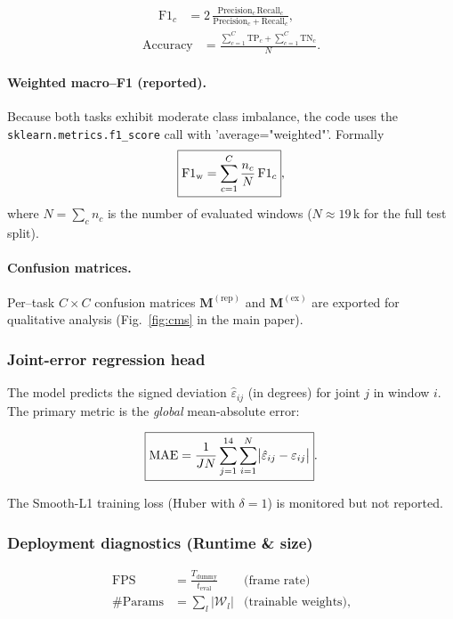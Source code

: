 \documentclass{article}
\begin{document}
\begin{enumerate}[label=\textbf{\Alph*.}, leftmargin=2em, itemsep=6pt]
\begin{align}
  \text{F1}_c &= 2\,
      \frac{\text{Precision}_c \,\text{Recall}_c}
           {\text{Precision}_c+\text{Recall}_c},           & \end{align}
  \begin{align} \text{Accuracy} &= \frac{\sum_{c=1}^{C}\text{TP}_c +
                            \sum_{c=1}^{C}\text{TN}_c}{N}.
  \label{eq:f1_acc}
\end{align}

\paragraph{Weighted macro–F1 (reported).}
Because both tasks exhibit moderate class imbalance, the code uses the
\verb|sklearn.metrics.f1_score| call with
'average="weighted"'.  
Formally
\[
  \boxed{%
    \text{F1}_\text{w} =
    \sum_{c=1}^{C} \frac{n_c}{N}\,\text{F1}_c
  } ,
\]
where $N=\sum_{c}n_c$ is the number of evaluated windows
($N\!\approx\!19\,\text{k}$ for the full test split).

\paragraph{Confusion matrices.}
Per–task $C\times C$ confusion matrices
$\mathbf{M}^{(\text{rep})}$ and
$\mathbf{M}^{(\text{ex})}$ are exported for qualitative
analysis (Fig.~\ref{fig:cms} in the main paper).

\subsubsection{Joint-error regression head}

The model predicts the signed deviation
$\hat{\varepsilon}_{ij}$ (in degrees) for joint $j$ in window $i$.
The primary metric is the \emph{global} mean-absolute error:

\[
  \boxed{%
    \text{MAE} =
    \frac{1}{JN}\sum_{j=1}^{14}\sum_{i=1}^{N}
    \bigl|\hat{\varepsilon}_{ij}-\varepsilon_{ij}\bigr|
  } .
\]

The Smooth-L1 training loss (Huber with $\delta\!=\!1$) is monitored
but not reported.

\subsubsection{Deployment diagnostics (Runtime & size)}

\begin{align}
  \text{FPS} &=
    \frac{T_\text{dummy}}{t_\text{eval}}
    &\text{(frame rate)}\\[4pt]
  \text{\#Params} &= \sum_{l}\bigl|\mathcal{W}_{l}\bigr|
    &\text{(trainable weights),}
\end{align}


\end{enumerate}
\end{document}
